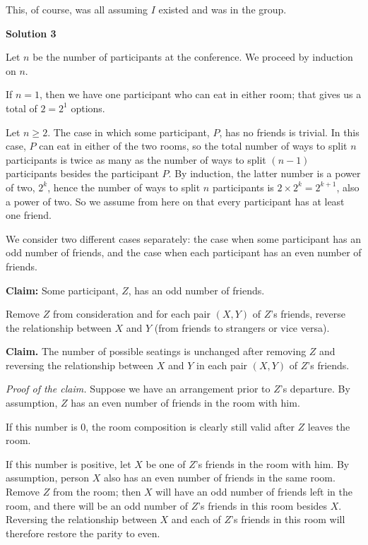 \begin{enumerate}
 This, of course, was all assuming $I$ existed and was in the group.

 



\textbf{Solution 3}

Let $n$ be the number of participants at the conference. We proceed by induction on $n$.

 If $n = 1$, then we have one participant who can eat in either room; that gives us a total of $2 = 2^1$ options.

 Let $n\geq 2$. The case in which some participant, $P$, has no friends is trivial. In this case, $P$ can eat in either of the two rooms, so the total number of ways to split $n$ participants is twice as many as the number of ways to split $(n - 1)$ participants besides the participant $P$. By induction, the latter number is a power of two, $2^k$, hence the number of ways to split $n$ participants is $2\times 2^k = 2^{k+1}$, also a power of two. So we assume from here on that every participant has at least one friend.

 We consider two different cases separately: the case when some participant has an odd number of friends, and the case when each participant has an even number of friends.

 \textbf{Claim:} Some participant, $Z$, has an odd number of friends.

 Remove $Z$ from consideration and for each pair $(X,Y)$ of $Z$'s friends, reverse the relationship between $X$ and $Y$ (from friends to strangers or vice versa).

 \textbf{Claim.} The number of possible seatings is unchanged after removing $Z$ and reversing the relationship between $X$ and $Y$ in each pair $(X,Y)$ of $Z$'s friends.

 \textit{Proof of the claim.} Suppose we have an arrangement prior to $Z$'s departure. By assumption, $Z$ has an even number of friends in the room with him.

 If this number is 0, the room composition is clearly still valid after $Z$ leaves the room.

 If this number is positive, let $X$ be one of $Z$'s friends in the room with him. By assumption, person $X$ also has an even number of friends in the same room. Remove $Z$ from the room; then $X$ will have an odd number of friends left in the room, and there will be an odd number of $Z$'s friends in this room besides $X$. Reversing the relationship between $X$ and each of $Z$'s friends in this room will therefore restore the parity to even.


\end{enumerate}
